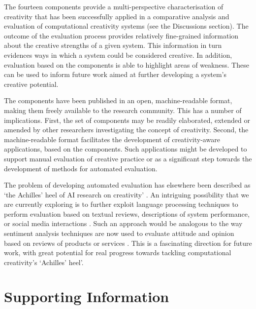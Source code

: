 \documentclass[10pt,letterpaper]{article}
\begin{document}
The fourteen components provide a multi-perspective characterisation of creativity that has been successfully applied in a comparative analysis and evaluation of computational creativity systems \cite{jordanous12cc,jordanousphd,jordanous16aisb} (see the Discussions section). The outcome of the evaluation process provides relatively fine-grained information about the creative strengths of a given system. This information in turn evidences ways in which a system could be considered creative. In addition, evaluation based on the components is able to highlight areas of weakness. These can be used to inform future work aimed at further developing a system's creative potential.

The components have been published in an open, machine-readable format, making them freely available to the research community. This has a number of implications. First, the set of components may be readily elaborated, extended or amended by other researchers investigating the concept of creativity. Second, the machine-readable format facilitates the development of creativity-aware applications, based on the components. Such applications might be developed to support manual evaluation of creative practice or as a significant step towards the development of methods for automated evaluation.

The problem of developing automated evaluation has elsewhere been described as `the Achilles' heel of AI research on creativity' \cite{boden99}.  An intriguing possibility that we are currently exploring is to further exploit language processing techniques to perform evaluation based on textual reviews, descriptions of system performance, or social media interactions \cite{jordanous15vem}. Such an approach would be analogous to the way sentiment analysis techniques are now used to evaluate attitude and opinion based on reviews of products or services \cite{panglee08}. This is a fascinating direction for future work, with great potential for real progress towards tackling computational creativity's `Achilles' heel'.




\section*{Supporting Information}

\end{document}
